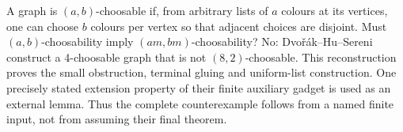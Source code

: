 A graph is $(a,b)$-choosable if, from arbitrary lists of $a$ colours at its vertices, one can choose $b$ colours per vertex so that adjacent choices are disjoint. Must $(a,b)$-choosability imply $(am,bm)$-choosability? No: Dvo\v r\'ak--Hu--Sereni construct a 4-choosable graph that is not $(8,2)$-choosable.
This reconstruction proves the small obstruction, terminal gluing and uniform-list construction. One precisely stated extension property of their finite auxiliary gadget is used as an external lemma. Thus the complete counterexample follows from a named finite input, not from assuming their final theorem.
